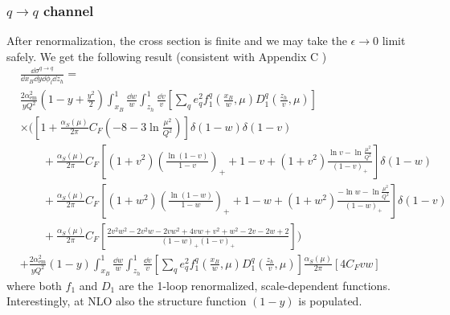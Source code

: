 \subsubsection{$q\to q$ channel}
After renormalization, the cross section is finite and we may take the $\epsilon\to0$ limit safely. We get the following result (consistent with Appendix C \cite{de_Florian_1998})
\begin{equation}
    \begin{aligned}
        &\frac{\dd \sigma^{q \to q}}{\dd x_B \dd y \dd \phi_l\dd z_h}=\\
        &\frac{2\alpha_{\text{em}}^2}{yQ^2}\left(1-y+\frac{y^2}{2}\right)\int_{x_B}^1\frac{\dd w}{w}\int_{z_h}^1\frac{\dd v}{v}\left[\sum_q e_q^2f_1^q\left(\frac{x_B}{w},\mu\right)D_1^q\left(\frac{z_h}{v},\mu\right)\right]\\
        &\times \Bigg(\left[1+\frac{\alpha_S(\mu)}{2\pi}C_F\left(-8-3\ln\frac{\mu^2}{Q^2}\right)\right]\delta(1-w)\delta(1-v)\\
        &\qquad+\frac{\alpha_S(\mu)}{2\pi}C_F\left[(1+v^2)\left(\frac{\ln(1-v)}{1-v}\right)_+ +1-v+(1+v^2)\frac{\ln v - \ln\frac{\mu^2}{Q^2}}{(1-v)_+}\right]\delta(1-w)\\
        &\qquad+\frac{\alpha_S(\mu)}{2\pi}C_F\left[(1+w^2)\left(\frac{\ln(1-w)}{1-w}\right)_+ +1-w+(1+w^2)\frac{-\ln w - \ln\frac{\mu^2}{Q^2}}{(1-w)_+}\right]\delta(1-v)\\
        &\qquad+\frac{\alpha_S(\mu)}{2\pi}C_F\left[\frac{2v^2w^2-2v^2w-2vw^2+4vw+v^2+w^2-2v-2w+2}{(1-w)_+(1-v)_+}\right]\Bigg)\\
        &+\frac{2\alpha_{\text{em}}^2}{yQ^2}\left(1-y\right)\int_{x_B}^1\frac{\dd w}{w}\int_{z_h}^1\frac{\dd v}{v}\left[\sum_q e_q^2 f_1^q\left(\frac{x_B}{w},\mu\right)D_1^q\left(\frac{z_h}{v},\mu\right)\right]\frac{\alpha_S(\mu)}{2\pi}\left[4C_Fvw\right]
    \end{aligned}
\end{equation}
where both $f_1$ and $D_1$ are the 1-loop renormalized, scale-dependent functions. Interestingly, at NLO also the structure function $(1-y)$ is populated.

